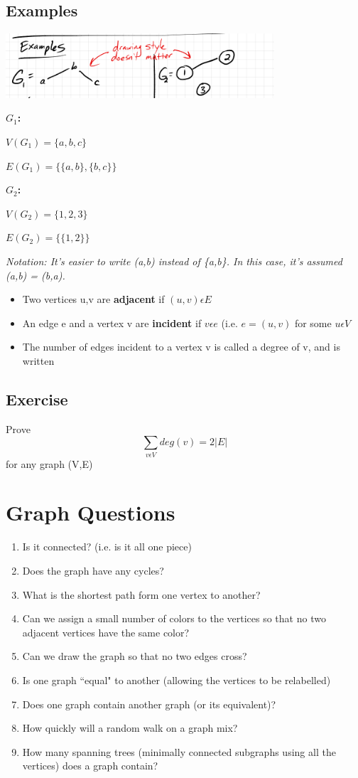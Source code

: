 \documentclass{article}
\begin{document}
\subsection{Examples}
\includegraphics[width=0.75\textwidth]{images/examples.png}

\textbf{$G_1$:}

$V(G_1) = \{a,b,c\}$

$E(G_1) = \{\{a,b\},\{b,c\}\}$

\textbf{$G_2$:}

$V(G_2) = \{1,2,3\}$

$E(G_2) = \{\{1,2\}\}$

\textit{Notation: It's easier to write (a,b) instead of \{a,b\}. In this case, it's assumed (a,b) = (b,a). }

\begin{itemize}
    \item Two vertices u,v are \textbf{adjacent} if $(u,v) \epsilon E$
    \item An edge e and a vertex v are \textbf{incident} if $v \epsilon e$ (i.e. $e = (u,v)$ for some $u \epsilon V$
    \item The number of edges incident to a vertex v is called a degree of v, and is written 
\end{itemize}
\subsection{Exercise}
 Prove $$\sum_{v \epsilon V} deg(v) = 2|E|$$ for any graph (V,E)
 
 
 \section{Graph Questions}
 \begin{enumerate}
  \item Is it connected? (i.e. is it all one piece)
  \item Does the graph have any cycles?
  \item What is the shortest path form one vertex to another?
  \item Can we assign a small number of colors to the vertices so that no two adjacent vertices have the same color?
  \item Can we draw the graph so that no two edges cross?
  \item Is one graph ``equal" to another (allowing the vertices to be relabelled)
  \item Does one graph contain another graph (or its equivalent)?
  \item How quickly will a random walk on a graph mix?
  \item How many spanning trees (minimally connected subgraphs using all the vertices) does a graph contain?
\end{enumerate}
\end{document}
